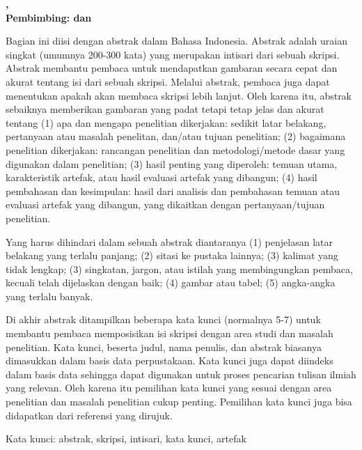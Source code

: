 \newpage
{}
\vspace{10mm}
\normalsize
\justifying

\noindent
\textbf{\pnama, \ptitle}
\textbf{
  \noindent
  \\Pembimbing: \ppembimbingsatu
  \ifthenelse{\equal{\ppembimbingdua}{}}
  {} {\phantom{ }dan \ppembimbingdua}}

\vspace{5mm}

\indent
Bagian ini diisi dengan abstrak dalam Bahasa Indonesia. Abstrak adalah uraian singkat (umumnya 200-300 kata) yang merupakan intisari dari sebuah skripsi. Abstrak membantu pembaca untuk mendapatkan gambaran secara cepat dan akurat tentang isi dari sebuah skripsi. Melalui abstrak, pembaca juga dapat menentukan apakah akan membaca skripsi lebih lanjut. Oleh karena itu, abstrak sebaiknya memberikan gambaran yang padat tetapi tetap jelas dan akurat tentang (1) apa dan mengapa penelitian dikerjakan: sedikit latar belakang, pertanyaan atau masalah penelitan, dan/atau tujuan penelitian; (2) bagaimana penelitian dikerjakan: rancangan penelitian dan metodologi/metode dasar yang digunakan dalam penelitian; (3) hasil penting yang diperoleh: temuan utama, karakteristik artefak, atau hasil evaluasi artefak yang dibangun; (4) hasil pembahasan dan kesimpulan: hasil dari analisis dan pembahasan temuan atau evaluasi artefak yang dibangun, yang dikaitkan dengan pertanyaan/tujuan penelitian.

Yang harus dihindari dalam sebuah abstrak diantaranya (1) penjelasan latar belakang yang terlalu panjang; (2) sitasi ke pustaka lainnya; (3) kalimat yang tidak lengkap; (3) singkatan, jargon, atau istilah yang membingungkan pembaca, kecuali telah dijelaskan dengan baik; (4) gambar atau tabel; (5) angka-angka yang terlalu banyak.

Di akhir abstrak ditampilkan beberapa kata kunci (normalnya 5-7) untuk membantu pembaca memposisikan isi skripsi dengan area studi dan masalah penelitian. Kata kunci, beserta judul, nama penulis, dan abstrak biasanya dimasukkan dalam basis data perpustakaan. Kata kunci juga dapat diindeks dalam basis data sehingga dapat digunakan untuk proses pencarian tulisan ilmiah yang relevan. Oleh karena itu pemilihan kata kunci yang sesuai dengan area penelitian dan masalah penelitian cukup penting. Pemilihan kata kunci juga bisa didapatkan dari referensi yang dirujuk. 

\vspace{5mm}
\noindent
Kata kunci: abstrak, skripsi, intisari, kata kunci, artefak
